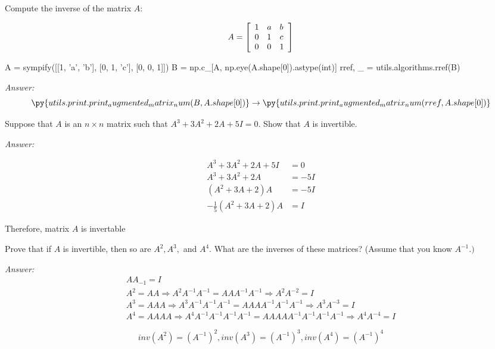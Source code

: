 \documentclass[letterpaper]{article}
\newcommand{\ans}{\textit{Answer: }}
\newenvironment{question}[2][Question]{\begin{trivlist}
\item[\hskip \labelsep {\bfseries #1}\hskip \labelsep {\bfseries #2.}]}{\end{trivlist}}
\begin{document}
\begin{question}{3.72}
  Compute the inverse of the matrix $A :$

$$A = \left[ \begin{array} { l l l } { 1 } & { a } & { b } \\ { 0 } & { 1 } & { c } \\ { 0 } & { 0 } & { 1 } \end{array} \right]$$

  \begin{pycode}
A = sympify([[1, 'a', 'b'], [0, 1, 'c'], [0, 0, 1]])
B = np.c_[A, np.eye(A.shape[0]).astype(int)]
rref, _ = utils.algorithms.rref(B)
  \end{pycode}

  \ans
  $$
  \py{utils.print.print_augmented_matrix_num(B, A.shape[0])}
  \rightarrow
  \py{utils.print.print_augmented_matrix_num(rref, A.shape[0])}
  $$
\end{question}

\begin{question}{3.78}
  Suppose that $A$ is an $n \times n$ matrix such that $A ^ { 3 } + 3 A ^ { 2 } + 2 A + 5 I = 0 .$ Show
  that $A$ is invertible.
  
  \ans

  \begin{align*}
    A ^ { 3 } + 3 A ^ { 2 } + 2 A + 5 I &= 0 \\
    A ^ { 3 } + 3 A ^ { 2 } + 2 A &= -5I \\
    (A^2 + 3A + 2)A &= -5I \\
    -\frac{1}{5}(A^2 + 3A + 2)A &= I
  \end{align*}

  Therefore, matrix $A$ is invertable
\end{question}

\begin{question}{3.83}
  Prove that if $A$ is invertible, then so are $A ^ { 2 } , A ^ { 3 } ,$ and $A ^ { 4 } .$ What are the inverses
  of these matrices? (Assume that you know $A ^ { - 1 } . )$
  
  \ans 
  \begin{gather*}
    AA_{-1} = I \\
    A^2 = AA \Rightarrow A^2A^{-1}A^{-1} = AAA^{-1}A^{-1} \Rightarrow A^2A^{-2} = I \\
    A^3 = AAA \Rightarrow A^3A^{-1}A^{-1}A^{-1} = AAAA^{-1}A^{-1}A^{-1} \Rightarrow A^3A^{-3} = I \\
    A^4 = AAAA \Rightarrow A^4A^{-1}A^{-1}A^{-1}A^{-1} = AAAAA^{-1}A^{-1}A^{-1}A^{-1} \Rightarrow A^4A^{-4} = I
  \end{gather*}

  $$
  inv(A^2) = (A^{-1})^2, 
  inv(A^3) = (A^{-1})^3, 
  inv(A^4) = (A^{-1})^4
  $$
\end{question}
\end{document}
